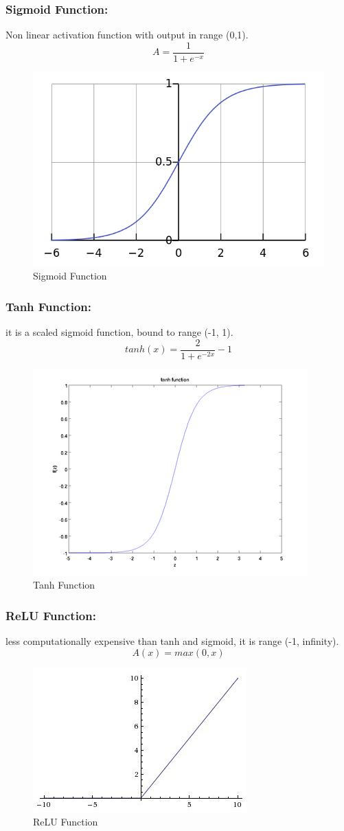 \documentclass[12pt]{report}
\begin{document}
\subsubsection{Sigmoid Function:}
Non linear activation function with output in range (0,1).
$$ A = \frac{1}{1+e^{-x}} $$

\begin{figure} [h]
    \centering
    \includegraphics[width=.6\textwidth]{./images/sigmoid.png}
    \caption{Sigmoid Function}
    \label{fig:sigmoid}
\end{figure}

\subsubsection{Tanh Function:}
it is a scaled sigmoid function, bound to range (-1, 1).
$$ tanh(x) = \frac{2}{1+ e^{-2x}} - 1 $$

\begin{figure} [h]
    \centering
    \includegraphics[width=.5\textwidth]{./images/tanh.png}
    \caption{Tanh Function}
    \label{fig:tanh}
\end{figure}

\subsubsection{ReLU Function:}
less computationally expensive than tanh and sigmoid, it is range (-1, infinity).
$$ A(x) = max(0,x) $$

\begin{figure} [h]
    \centering
    \includegraphics[width=.5\textwidth]{./images/relu.jpeg}
    \caption{ReLU Function}
    \label{fig:relu}
\end{figure}
\end{document}
